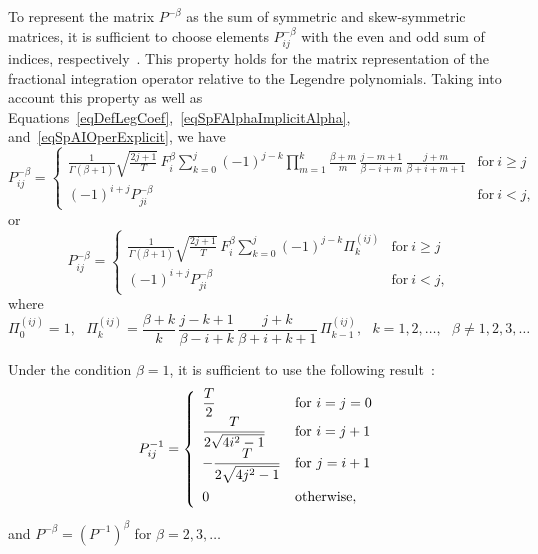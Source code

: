 \documentclass[10pt,reqno]{amsart}
\theoremstyle{plain}
\theoremstyle{remark}
\begin{document}
To represent the matrix $P^{-\beta}$ as the sum of symmetric and skew-symmetric matrices, it is sufficient to choose elements $P_{ij}^{-\beta}$ with the even and odd sum of indices, respectively~\cite{Ryb_Comp25}. This property holds for the matrix representation of the fractional integration operator relative to the Legendre polynomials. Taking into account this property as well as Equations~\eqref{eqDefLegCoef},~\eqref{eqSpFAlphaImplicitAlpha}, and~\eqref{eqSpAIOperExplicit}, we have
\begin{equation}\label{eqSpOperIFracLExplicitSafe1}
  P_{ij}^{-\beta} = \left\{
    \begin{array}{ll}
      \displaystyle \frac{1}{\Gamma(\beta+1)} \sqrt{\frac{2j+1}{T}} \, F_i^\beta \sum\limits_{k=0}^j (-1)^{j-k} \prod\limits_{m=1}^k \frac{\beta+m}{m} \, \frac{j-m+1}{\beta-i+m} \, \frac{j+m}{\beta+i+m+1} & \text{for} ~ i \geqslant j \\
      (-1)^{i+j} P_{ji}^{-\beta} & \text{for} ~ i < j,
    \end{array}
  \right.
\end{equation}
or
\begin{equation}\label{eqSpOperIFracLExplicitSafe2}
  P_{ij}^{-\beta} = \left\{
    \begin{array}{ll}
      \displaystyle \frac{1}{\Gamma(\beta+1)} \sqrt{\frac{2j+1}{T}} \, F_i^\beta \sum\limits_{k=0}^j (-1)^{j-k} \Pi_k^{(ij)} & \text{for} ~ i \geqslant j \\
      (-1)^{i+j} P_{ji}^{-\beta} & \text{for} ~ i < j,
    \end{array}
  \right.
\end{equation}
where
\[
  \Pi_0^{(ij)} = 1, \ \ \ \Pi_k^{(ij)} = \frac{\beta+k}{k} \, \frac{j-k+1}{\beta-i+k} \, \frac{j+k}{\beta+i+k+1} \, \Pi_{k-1}^{(ij)}, \ \ \ k = 1,2,\dots, \ \ \ \beta \neq 1,2,3,\dots
\]

Under the condition $\beta = 1$, it is sufficient to use the following result~\cite{SolSemPeshNed_79}:
\begin{equation}\label{eqSpOperIExplicit}
  P_{ij}^{-1} = \left\{
    \begin{array}{ll}
      \displaystyle \frac{T}{2} & \text{for} ~ i = j = 0 \\
      \displaystyle \frac{T}{2\sqrt{4i^2-1}} & \text{for} ~ i = j + 1 \\
      \displaystyle -\frac{T}{2\sqrt{4j^2-1}} & \text{for} ~ j = i + 1 \\
      \displaystyle 0 \vphantom{\frac12} & \text{otherwise},
    \end{array}
  \right.
\end{equation}
and $P^{-\beta} = (P^{-1})^\beta$ for $\beta = 2,3,\dots$
\end{document}
